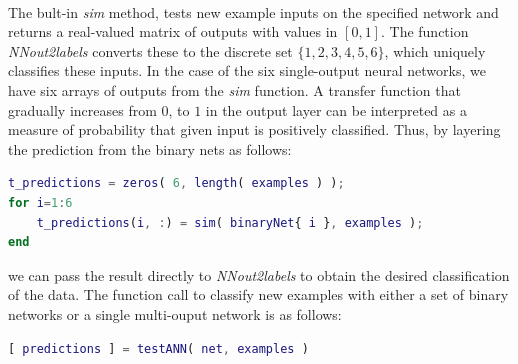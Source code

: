\documentclass[a4paper,12pt,oneside,final]{report}
\newenvironment{changemargin}[2]{\begin{list}{}{%
\setlength{\topsep}{0pt}%
\setlength{\leftmargin}{0pt}%
\setlength{\rightmargin}{0pt}%
\setlength{\listparindent}{\parindent}%
\setlength{\itemindent}{\parindent}%
\setlength{\parsep}{0pt plus 1pt}%
\addtolength{\leftmargin}{#1}%
\addtolength{\rightmargin}{#2}%
}\item }{\end{list}}
\begin{document}
\paragraph{}
The bult-in \textit{sim} method, tests new example inputs on the specified network and returns a real-valued matrix of outputs with values in $[0,1]$.  The function \textit{NNout2labels} converts these to the discrete set $\{1,2,3,4,5,6\}$, which uniquely classifies these inputs.  In the case of the six single-output neural networks, we have six arrays of outputs from the \textit{sim} function.  A transfer function that gradually increases from $0$, to $1$ in the output layer can be interpreted as a measure of probability that given input is positively classified.  Thus, by layering the prediction from the binary nets as follows:
\begin{lstlisting}[language=Matlab, frame=single]
t_predictions = zeros( 6, length( examples ) );
for i=1:6
	t_predictions(i, :) = sim( binaryNet{ i }, examples );
end
\end{lstlisting}
we can pass the result directly to \textit{NNout2labels} to obtain the desired classification of the data.  The function call to classify new examples with either a set of binary networks or a single multi-ouput network is as follows:
\begin{changemargin}{-5mm}{-5mm}
\begin{lstlisting}[language=Matlab, frame=single]
[ predictions ] = testANN( net, examples )
\end{lstlisting}
\end{changemargin}

\end{document}
